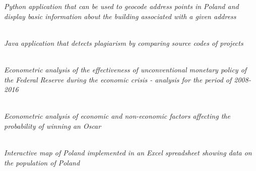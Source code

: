 \documentclass{cls/gml_cv_sets}
\begin{document}
\begin{paracol}{2}
{{\textit{\footnotesize Python application that can be used to geocode address 
points in Poland and display basic information about the building associated 
with a given address} \\ \vspace{0.6em}

 \\

\textit{\footnotesize Java application that detects plagiarism by comparing 
source codes of projects} \\ \vspace{0.6em}

 \\ 

\textit{\footnotesize Econometric analysis of the effectiveness of 
unconventional monetary policy of the Federal Reserve during the economic 
crisis - analysis for the period of 2008-2016} \\ \vspace{0.6em}

 \\ 

\textit{\footnotesize Econometric analysis of economic and non-economic 
factors affecting the probability of winning an Oscar} \\ \vspace{0.6em}

 \\ 

\textit{\footnotesize Interactive map of Poland implemented in an Excel 
spreadsheet showing data on the population of Poland} \\}}

\switchcolumn


\end{paracol}
\end{document}
